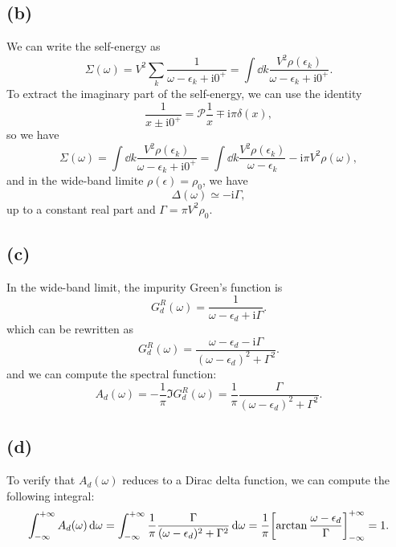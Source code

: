 \documentclass{article}
\newcommand{\ii}{\mathrm{i}}
\begin{document}
\subsection*{(b)}
We can write the self-energy as
\begin{equation}
    \Sigma(\omega)=V^2\sum_k \frac{1}{\omega-\epsilon_k+ \ii 0^+}=\int \dd{k}\frac{V^2 \rho(\epsilon_k)}{\omega-\epsilon_k+ \ii 0^+}.
\end{equation}
To extract the imaginary part of the self-energy, we can use the identity
\begin{equation}
    \frac{1}{x\pm \ii 0^+}=\mathcal{P}\frac{1}{x}\mp \ii \pi \delta(x),
\end{equation}
so we have
\begin{equation}
    \Sigma(\omega)=\int \dd{k}\frac{V^2 \rho(\epsilon_k)}{\omega-\epsilon_k+ \ii 0^+}=\int \dd{k}\frac{V^2 \rho(\epsilon_k)}{\omega-\epsilon_k}-\ii \pi V^2 \rho(\omega),
\end{equation}
and in the wide-band limite $\rho(\epsilon)=\rho_0$, we have
\begin{equation}
    \Delta(\omega)\simeq -\ii\Gamma,
\end{equation}
up to a constant real part and $\Gamma=\pi V^2 \rho_0$.

\subsection*{(c)}
In the wide-band limit, the impurity Green's function is
\begin{equation}
    G^R_d(\omega)=\frac{1}{\omega-\epsilon_d+\ii \Gamma}.
\end{equation}
which can be rewritten as 
\begin{equation}
    G^R_d(\omega)=\frac{\omega-\epsilon_d-\ii \Gamma}{(\omega-\epsilon_d)^2+\Gamma^2}.
\end{equation}
and we can compute the spectral function: 
\begin{equation}
    A_d(\omega)=-\frac{1}{\pi}\Im G^R_d(\omega)=\frac{1}{\pi}\frac{\Gamma}{(\omega-\epsilon_d)^2+\Gamma^2}.
\end{equation}

\subsection*{(d)}
To verify that $A_d(\omega)$ reduces to a Dirac delta function, we can compute the following integral:
\begin{equation}
    \int_{-\infty}^{+\infty} A_d(\omega)\dd{\omega}=\int_{-\infty}^{+\infty}\frac{1}{\pi}\frac{\Gamma}{(\omega-\epsilon_d)^2+\Gamma^2}\dd{\omega}=\frac{1}{\pi}\qty[\arctan\frac{\omega-\epsilon_d}{\Gamma}]_{-\infty}^{+\infty}=1. 
\end{equation}
\end{document}
